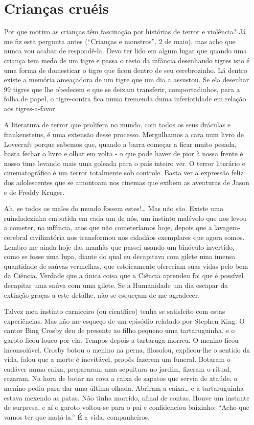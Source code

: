 \chapter{Crianças cruéis}

Por que motivo as crianças têm fascinação por histórias de terror e
violência? Já me fiz esta pergunta antes (“Crianças e monstros”, 2 de
maio), mas acho que nunca vou acabar de respondê-la. Devo ter lido em
algum lugar que quando uma criança tem medo de um tigre e passa o
resto da infância desenhando tigres isto é uma forma de domesticar o
tigre que ficou dentro de seu cerebrozinho. Lá dentro existe a
memória ameaçadora de um tigre que um dia a assustou. Se ela desenhar
99 tigres que lhe obedecem e que se deixam transferir,
comportadinhos, para a folha de papel, o tigre-contra fica numa
tremenda duma inferioridade em relação aos tigres-a-favor.

A literatura de terror que prolifera no mundo, com todos os seus
dráculas e frankensteins, é uma extensão desse processo. Mergulhamos
a cara num livro de Lovecraft porque sabemos que, quando a barra
começar a ficar muito pesada, basta fechar o livro e olhar em volta -
o que pode haver de pior à nossa frente é nosso time levando mais uma
goleada para o país inteiro ver.  O terror literário e
cinematográfico é um terror totalmente sob controle. Basta ver a
expressão feliz dos adolescentes que se amontoam nos cinemas que
exibem as aventuras de Jason e de Freddy Kruger.

Ah, se todos os males do mundo fossem estes!… Mas não são. Existe uma
ruindadezinha embutida em cada um de nós, um instinto malévolo que
nos levou a cometer, na infância, atos que não cometeríamos hoje,
depois que a lavagem-cerebral civilizatória nos transformou nos
cidadãos exemplares que agora somos. Lembro-me ainda hoje das manhãs
que passei usando um binóculo invertido, como se fosse uma lupa,
diante do qual eu decapitava com gilete uma imensa quantidade de
saúvas vermelhas, que estoicamente ofereciam suas vidas pelo bem da
Ciência. Verdade que a única coisa que a Ciência aprendeu foi que é
possível decapitar uma saúva com uma gilete. Se a Humanidade um dia
escapar da extinção graças a este detalhe, não se esqueçam de me
agradecer. 

Talvez meu instinto carniceiro (ou científico) tenha se satisfeito com
estas experiências. Mas não me esqueço de um episódio relatado por
Stephen King. O cantor Bing Crosby deu de presente ao filho pequeno
uma tartaruguinha, e o garoto ficou louco por ela. Tempos depois a
tartaruga morreu. O menino ficou inconsolável. Crosby botou o menino
na perna, filosofou, explicou-lhe o sentido da vida, falou que a
morte é inevitável, propôs fazerem um funeral. Botaram o cadáver numa
caixa, prepararam uma sepultura no jardim, fizeram o ritual, rezaram.
Na hora de botar na cova a caixa de sapatos que servia de ataúde, o
menino pediu para dar uma última olhada. Abriram a caixa… e a
tartaruguinha estava mexendo as patas. Não tinha morrido, afinal de
contas. Houve um instante de surpresa, e aí o garoto voltou-se para o
pai e confidenciou baixinho: “Acho que vamos ter que matá-la.”  É a
vida, companheiros.


